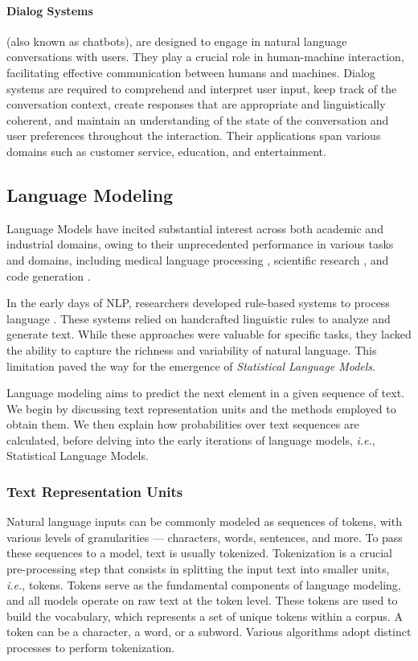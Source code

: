 \paragraph{Dialog Systems} (also known as chatbots), are designed to engage in natural language conversations with users. They play a crucial role in human-machine interaction, facilitating effective communication between humans and machines. Dialog systems are required to comprehend and interpret user input, keep track of the conversation context, create responses that are appropriate and linguistically coherent, and maintain an understanding of the state of the conversation and user preferences throughout the interaction. Their applications span various domains such as customer service, education, and entertainment. \\

\subsection{Language Modeling}

Language Models have incited substantial interest across both academic and industrial domains, owing to their unprecedented performance in various tasks and domains, including medical language processing \citep{thirunavukarasu2023large}, scientific research \citep{wang2023scientific}, and code generation \citep{xu2022systematic}.

In the early days of \ac{NLP}, researchers developed rule-based systems to process language \citep{manning1999foundations}. These systems relied on handcrafted linguistic rules to analyze and generate text. While these approaches were valuable for specific tasks, they lacked the ability to capture the richness and variability of natural language. This limitation paved the way for the emergence of \textit{Statistical Language Models}. 

Language modeling aims to predict the next element in a given sequence of text. We begin by discussing text representation units and the methods employed to obtain them. We then explain how probabilities over text sequences are calculated, before delving into the early iterations of language models, \textit{i.e.}, Statistical Language Models.

\subsubsection{Text Representation Units}

Natural language inputs can be commonly modeled as sequences of tokens, with various levels of granularities — characters, words, sentences, and more. To pass these sequences to a model, text is usually tokenized. Tokenization is a crucial pre-processing step that consists in splitting the input text into smaller units, \textit{i.e.}, tokens. Tokens serve as the fundamental components of language modeling, and all models operate on raw text at the token level. These tokens are used to build the vocabulary, which represents a set of unique tokens within a corpus. A token can be a character, a word, or a subword. Various algorithms adopt distinct processes to perform tokenization. 

